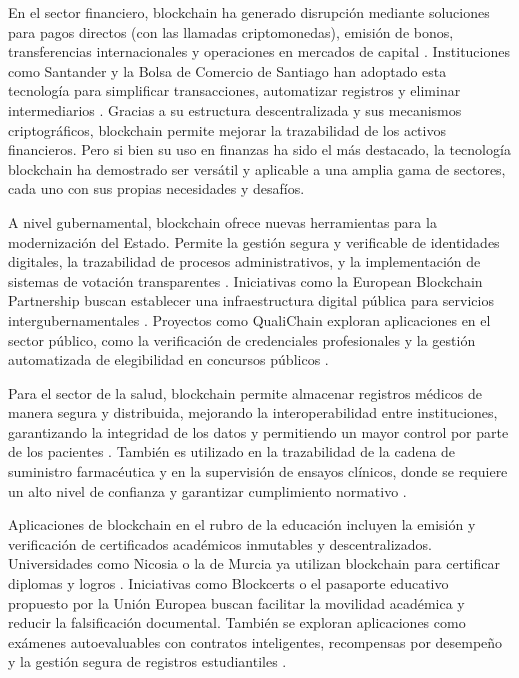 En el sector financiero, blockchain ha generado disrupción mediante soluciones para pagos directos (con las llamadas criptomonedas), emisión de bonos, transferencias internacionales y operaciones en mercados de capital \cite{bartolomeo2020introduccion}. Instituciones como Santander y la Bolsa de Comercio de Santiago han adoptado esta tecnología para simplificar transacciones, automatizar registros y eliminar intermediarios \cite{bartolomeo2020introduccion}. Gracias a su estructura descentralizada y sus mecanismos criptográficos, blockchain permite mejorar la trazabilidad de los activos financieros. Pero si bien su uso en finanzas ha sido el más destacado, la tecnología blockchain ha demostrado ser versátil y aplicable a una amplia gama de sectores, cada uno con sus propias necesidades y desafíos.

A nivel gubernamental, blockchain ofrece nuevas herramientas para la modernización del Estado. Permite la gestión segura y verificable de identidades digitales, la trazabilidad de procesos administrativos, y la implementación de sistemas de votación transparentes \cite{vaigandla2023review}. Iniciativas como la European Blockchain Partnership buscan establecer una infraestructura digital pública para servicios intergubernamentales \cite{diez2023web}. Proyectos como QualiChain exploran aplicaciones en el sector público, como la verificación de credenciales profesionales y la gestión automatizada de elegibilidad en concursos públicos \cite{diez2023web}.

Para el sector de la salud, blockchain permite almacenar registros médicos de manera segura y distribuida, mejorando la interoperabilidad entre instituciones, garantizando la integridad de los datos y permitiendo un mayor control por parte de los pacientes \cite{sunny2022systematic}. También es utilizado en la trazabilidad de la cadena de suministro farmacéutica y en la supervisión de ensayos clínicos, donde se requiere un alto nivel de confianza y garantizar cumplimiento normativo \cite{vaigandla2023review}.

Aplicaciones de blockchain en el rubro de la educación incluyen la emisión y verificación de certificados académicos inmutables y descentralizados. Universidades como Nicosia o la de Murcia ya utilizan blockchain para certificar diplomas y logros \cite{diez2023web}. Iniciativas como Blockcerts o el pasaporte educativo propuesto por la Unión Europea buscan facilitar la movilidad académica y reducir la falsificación documental. También se exploran aplicaciones como exámenes autoevaluables con contratos inteligentes, recompensas por desempeño y la gestión segura de registros estudiantiles \cite{diez2023web}.

